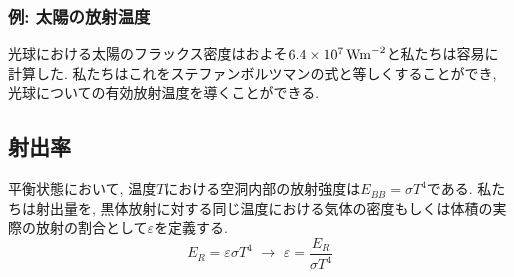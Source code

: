 \documentclass[a4j,12pt,openbib,oneside,dvipdfmx]{jbook}
\begin{document}
\subsubsection{例: 太陽の放射温度}
光球における太陽のフラックス密度はおよそ$6.4\times10^7\,\rm{Wm}^{-2}$と私たちは容易に計算した. 私たちはこれをステファンボルツマンの式と等しくすることができ, 光球についての有効放射温度を導くことができる. 

\subsection{射出率}
平衡状態において, 温度$T$における空洞内部の放射強度は$E_{BB}=\sigma{T^4}$である. 
私たちは射出量を, 黒体放射に対する同じ温度における気体の密度もしくは体積の実際の放射の割合として$\varepsilon$を定義する.
\begin{equation}
  E_R=\varepsilon\sigma{T^4} \,\,\to\,\, \varepsilon=\frac{E_R}{\sigma{T^4}}
\end{equation}
\newpage
{}
\end{document}

